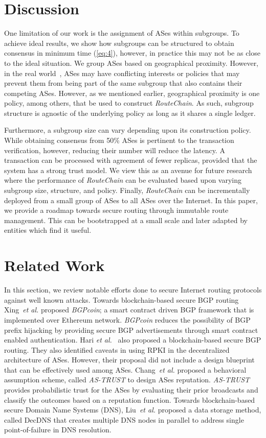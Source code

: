 \documentclass[5p]{elsarticle}
\newcommand{\rc}{{{\em RouteChain}}\xspace}
\newcommand{\etal}{{\em et al.}\xspace}
\begin{document}
\section{Discussion}\label{sec:discussion}
One limitation of our work is the assignment of ASes within subgroups. To achieve ideal results, we show how subgroups can be structured to obtain consensus in minimum time (\autoref{eq:4}), however, in practice this may not be as close to the ideal situation. We group ASes based on geographical proximity. However, in the real world~\cite{LiangBXH11}, ASes may have conflicting interests or policies that may prevent them from being part of the same subgroup that also contains their competing ASes. However, as we mentioned earlier, geographical proximity is one policy, among others, that be used to construct \rc. As such, subgroup structure is agnostic of the underlying policy as long as it shares a single ledger.


Furthermore, a subgroup size can vary depending upon its construction policy. While obtaining consensus from 50\% ASes is pertinent to the transaction verification, however, reducing their number will reduce the latency. A transaction can be processed with agreement of fewer replicas, provided that the system has a strong trust model. We view this as an avenue for future research where the performance of \rc can be evaluated based upon varying subgroup size, structure, and policy. Finally, \rc can be incrementally deployed from a small group of ASes to all ASes over the Internet. In this paper, we provide a roadmap towards secure routing through immutable route management. This can be bootstrapped at a small scale and later adapted by entities which find it useful. 


\section{Related Work}\label{sec:rw}
In this section, we review notable efforts done to secure Internet routing protocols against well known attacks. Towards blockchain-based secure BGP routing Xing~\etal\cite{XingWW18} proposed  {\em BGPcoin}; a smart contract driven BGP framework that is implemented over Ethereum network. {\em BGPcoin} reduces the possibility of BGP prefix hijacking by providing secure BGP advertisements through smart contract enabled authentication. Hari \etal~\cite{HariL16} also proposed a blockchain-based secure BGP routing. They also identified caveats in using RPKI in the decentralized architecture of ASes. However, their proposal did not include a design blueprint that can be effectively used among ASes. Chang~\etal\cite{ChangVWKLSL11} proposed a behavioral assumption scheme, called {\em AS-TRUST} to design ASes reputation. {\em AS-TRUST} provides probabilistic trust for the ASes by evaluating their prior broadcasts and classify the outcomes based on a reputation function. Towards blockchain-based secure Domain Name Systems (DNS), Liu~\etal\cite{LiuLCHXW18} proposed a data storage method, called DecDNS that creates multiple DNS nodes in parallel to address single point-of-failure in DNS resolution. 
\end{document}
